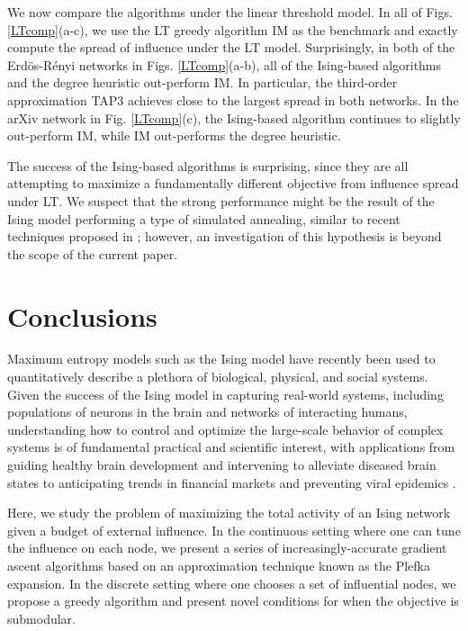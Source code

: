 \documentclass[letterpaper]{article} %
\begin{document}
We now compare the algorithms under the linear threshold model. In all of Figs. \ref{LTcomp}(a-c), we use the LT greedy algorithm IM as the benchmark and exactly compute the spread of influence under the LT model. Surprisingly, in both of the Erd\"{o}s-R\'{e}nyi networks in Figs. \ref{LTcomp}(a-b), all of the Ising-based algorithms and the degree heuristic out-perform IM. In particular, the third-order approximation TAP3 achieves close to the largest spread in both networks. In the arXiv network in Fig. \ref{LTcomp}(c), the Ising-based algorithm continues to slightly out-perform IM, while IM out-performs the degree heuristic.

The success of the Ising-based algorithms is surprising, since they are all attempting to maximize a fundamentally different objective from influence spread under LT. We suspect that the strong performance might be the result of the Ising model performing a type of simulated annealing, similar to recent techniques proposed in \cite{Jiang-01}; however, an investigation of this hypothesis is beyond the scope of the current paper.

\section{Conclusions}

Maximum entropy models such as the Ising model have recently been used to quantitatively describe a plethora of biological, physical, and social systems. Given the success of the Ising model in capturing real-world systems, including populations of neurons in the brain and networks of interacting humans, understanding how to control and optimize the large-scale behavior of complex systems is of fundamental practical and scientific interest, with applications from guiding healthy brain development \cite{Goddard-01} and intervening to alleviate diseased brain states \cite{Goddard-02} to anticipating trends in financial markets \cite{Mantegna-01} and preventing viral epidemics \cite{Pastor-01}.

Here, we study the problem of maximizing the total activity of an Ising network given a budget of external influence. In the continuous setting where one can tune the influence on each node, we present a series of increasingly-accurate gradient ascent algorithms based on an approximation technique known as the Plefka expansion. In the discrete setting where one chooses a set of influential nodes, we propose a greedy algorithm and present novel conditions for when the objective is submodular.
\end{document}
